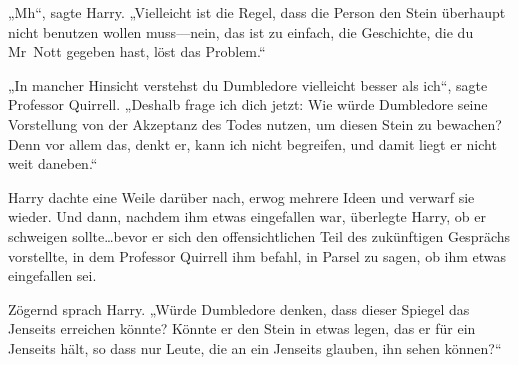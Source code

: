 „Mh“, sagte Harry. „Vielleicht ist die Regel, dass die Person den Stein überhaupt nicht benutzen wollen muss—nein, das ist zu einfach, die Geschichte, die du Mr~Nott gegeben hast, löst das Problem.“

„In mancher Hinsicht verstehst du Dumbledore vielleicht besser als ich“, sagte Professor Quirrell. „Deshalb frage ich dich jetzt: Wie würde Dumbledore seine Vorstellung von der Akzeptanz des Todes nutzen, um diesen Stein zu bewachen? Denn vor allem das, denkt er, kann ich nicht begreifen, und damit liegt er nicht weit daneben.“

Harry dachte eine Weile darüber nach, erwog mehrere Ideen und verwarf sie wieder. Und dann, nachdem ihm etwas eingefallen war, überlegte Harry, ob er schweigen sollte…bevor er sich den offensichtlichen Teil des zukünftigen Gesprächs vorstellte, in dem Professor Quirrell ihm befahl, in Parsel zu sagen, ob ihm etwas eingefallen sei.

Zögernd sprach Harry. „Würde Dumbledore denken, dass dieser Spiegel das Jenseits erreichen könnte? Könnte er den Stein in etwas legen, das er für ein Jenseits hält, so dass nur Leute, die an ein Jenseits glauben, ihn sehen können?“

